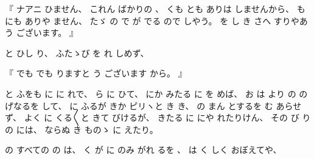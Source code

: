 %
『
ナアニ
ひません、
%
これん
ばかりの
、
%
くも
とも
ありは
しませんから、
%
も%
にも
ありや
ません、
%
たゞ%
の
で
が
でる
ので
しやう。
%
を
し
き%
さへ
すりやあ
う
ございます。
』

%
と
ひし
り、
%
ふたゝび%
を
れ
しめず、

%
『
でも
でも
りますと
う
ございます
から。
』

%
と
ふをも
に
に%
れで、
%
ら
に
ひて、
%
にか
みたる%
に
を
めば、%
%
お
は
より
の
の
げなるを
して、
%
に
ふるが
きか
ピリヽと%
き
き、
%
の
%
まん
とするを
む
あらせず、
%
よく
に
くる〳〵と
きて
びけるが、
%
きたる
に
にや
れたりけん、
%
その
び
りの
には、
%
ならぬ
き
ものゝ%
に
えたり。

%
の
すべての
の
は、
%
く%
が
に
のみ
がれ%
るを
、
%
%
は
く
しく
おぼえてや、

